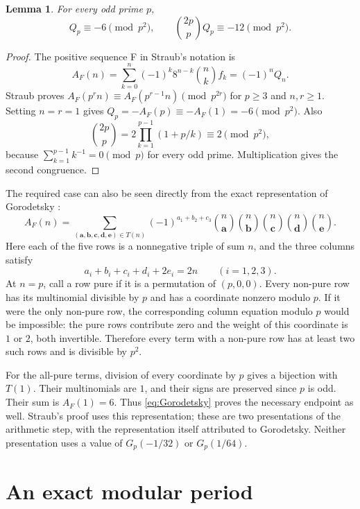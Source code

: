 \documentclass[11pt,a4paper]{article}
\newtheorem{lemma}[theorem]{Lemma}
\theoremstyle{remark}
\begin{document}
\begin{lemma}\label{lem:endpoint}
For every odd prime $p$,
\begin{equation}\label{eq:endpoint}
 Q_p\equiv-6\pmod{p^2},\qquad
 \binom{2p}p Q_p\equiv-12\pmod{p^2}.
\end{equation}
\end{lemma}
\begin{proof}
The positive sequence F in Straub's notation is
\[
 A_F(n)=\sum_{k=0}^n(-1)^k8^{n-k}\binom nk f_k=(-1)^nQ_n.
\]
Straub \cite[p.~5, (10), Theorem~3.2]{straub} proves
$A_F(p^rn)\equiv A_F(p^{r-1}n)\pmod{p^{2r}}$ for
$p\ge3$ and $n,r\ge1$. Setting $n=r=1$ gives
$Q_p=-A_F(p)\equiv-A_F(1)=-6\pmod{p^2}$.
Also
\[
 \binom{2p}p=2\prod_{k=1}^{p-1}(1+p/k)\equiv2\pmod{p^2},
\]
because $\sum_{k=1}^{p-1}k^{-1}=0\pmod p$ for every odd prime.
Multiplication gives the second congruence.
\end{proof}

The required case can also be seen directly from the exact
representation of Gorodetsky \cite[p.~4, Proposition~1.2, (1.8)]{gorodetsky}:
\begin{equation}\label{eq:Gorodetsky}
 A_F(n)=\sum_{(\mathbf a,\mathbf b,\mathbf c,\mathbf d,\mathbf e)\in T(n)}
 (-1)^{a_1+b_2+c_3}
 \binom n{\mathbf a}\binom n{\mathbf b}\binom n{\mathbf c}
 \binom n{\mathbf d}\binom n{\mathbf e}.
\end{equation}
Here each of the five rows is a nonnegative triple of sum $n$, and
the three columns satisfy
\[
 a_i+b_i+c_i+d_i+2e_i=2n\qquad(i=1,2,3).
\]
At $n=p$, call a row pure if it is a permutation of $(p,0,0)$.
Every non-pure row has its multinomial divisible by $p$ and has a
coordinate nonzero modulo $p$. If it were the only non-pure row,
the corresponding column equation modulo $p$ would be impossible:
the pure rows contribute zero and the weight of this coordinate is
$1$ or $2$, both invertible. Therefore every term with a non-pure
row has at least two such rows and is divisible by $p^2$.

For the all-pure terms, division of every coordinate by $p$ gives
a bijection with $T(1)$. Their multinomials are $1$, and their signs
are preserved since $p$ is odd. Their sum is $A_F(1)=6$.
Thus \eqref{eq:Gorodetsky} proves the necessary endpoint as well.
Straub's proof uses this representation; these are two presentations
of the arithmetic step, with the representation itself attributed
to Gorodetsky. Neither presentation uses a value of $G_p(-1/32)$ or $G_p(1/64)$.

\section{An exact modular period}\label{sec:period}
\end{document}
